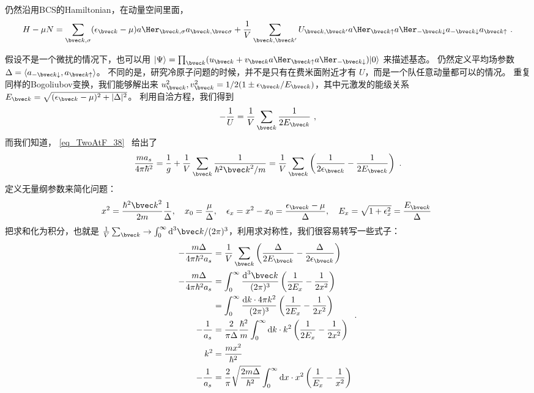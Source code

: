 
仍然沿用BCS的Hamiltonian，在动量空间里面，
\begin{equation}
H-\mu N = \sum_{{\bvec k},\sigma}(\epsilon_{\bvec k}-\mu)a\Her_{{\bvec k},\sigma}a_{\bvec k, \bvec \sigma}+\frac{1}{V}\sum_{\bvec k,  \bvec k'}U_{\bvec k, \bvec k'}a\Her_{\bvec k\uparrow}a\Her_{-\bvec k\downarrow}a_{-\bvec k\downarrow}a_{\bvec k\uparrow}~.
\end{equation}

假设不是一个微扰的情况下，也可以用 $|\Psi\rangle = \prod_{\bvec k}(u_{\bvec k}+v_{\bvec k}a\Her_{\bvec k\uparrow}a\Her_{-\bvec k\downarrow})|0\rangle$ 来描述基态。 仍然定义平均场参数 $\Delta = \langle a_{-\bvec k\downarrow},a_{\bvec k\uparrow}\rangle$。 不同的是，研究冷原子问题的时候，并不是只有在费米面附近才有 $U$，而是一个队任意动量都可以的情况。 重复同样的Bogoliubov变换，我们能够解出来 $u_{\bvec k}^2, v_{\bvec k}^2 = 1/2(1\pm\epsilon_{\bvec k}/E_{\bvec k})$，其中元激发的能级关系$E_{\bvec k}=\sqrt{(\epsilon_{\bvec k}-\mu)^2+|\Delta|^2}$。 利用自洽方程，我们得到
\begin{equation}
-\frac{1}{U} = \frac{1}{V}\sum_{\bvec k}\frac{1}{2E_{\bvec k}}~,
\end{equation}
而我们知道， \autoref{eq_TwoAtF_38}~ 给出了
\begin{equation}
\frac{ma_s}{4\pi\hbar^2} = \frac{1}{g} + \frac{1}{V}\sum_{\bvec k}\frac{1}{\hbar^2{\bvec k}^2/m} = \frac{1}{V}\sum_{\bvec k}\left(\frac{1}{2\epsilon_{\bvec k}} - \frac{1}{2E_{\bvec k}}\right)~.
\end{equation}
定义无量纲参数来简化问题：
\begin{equation}
x^2 = \frac{\hbar^2{\bvec k}^2}{2m}\frac{1}{\Delta},\quad x_0 = \frac{\mu}{\Delta},\quad \epsilon_x = x^2-x_0 = \frac{\epsilon_{\bvec k}-\mu}{\Delta},\quad E_x = \sqrt{1+\epsilon_x^2} = \frac{E_{\bvec k}}{\Delta}~
\end{equation}
把求和化为积分，也就是 $\frac{1}{V}\sum_{\bvec k}\to\int_0^\infty \text{d}^3{\bvec k}/(2\pi)^3$，利用求对称性，我们很容易转写一些式子：
\begin{equation}
\begin{split}
-\frac{m\Delta}{4\pi\hbar^2 a_s} &=\frac{1}{V}\sum_{\bvec k}\left(\frac{\Delta}{2E_{\bvec k}} - \frac{\Delta}{2\epsilon_{\bvec k}}\right)\\
-\frac{m\Delta}{4\pi\hbar^2 a_s} &=\int_0^\infty\frac{\text{d}^3{\bvec k}}{(2\pi)^3}\left(\frac{1}{2E_x} - \frac{1}{2x^2}\right) \\
&=\int_0^\infty\frac{\text{d}k\cdot 4\pi k^2}{(2\pi)^3}\left(\frac{1}{2E_x} - \frac{1}{2x^2}\right)\\
-\frac{1}{a_s} &= \frac{2}{\pi\Delta}\frac{\hbar^2}{m}\int_0^\infty\text{d}k\cdot k^2\left(\frac{1}{2E_x} - \frac{1}{2x^2}\right)\\
k^2 &= \frac{mx^2}{\hbar^2}\\
-\frac{1}{a_s} &= \frac{2}{\pi}\sqrt{\frac{2m\Delta}{\hbar^2}}\int_0^\infty \text{d}x\cdot x^2\left(\frac{1}{E_x}-\frac{1}{x^2}\right)
\end{split}~.
\end{equation}
